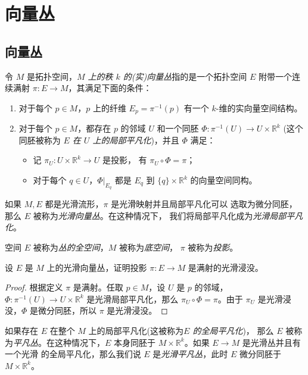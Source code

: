 \documentclass[fontset=none]{Notes}
\begin{document}
\chapter{向量丛}

\section{向量丛}

令 $M$ 是拓扑空间，\emph{$M$ 上的秩 $k$ 的(实)向量丛}指的是一个拓扑空间
$E$ 附带一个连续满射 $\pi:E\to M$，其满足下面的条件：
\begin{enumerate}
  \item 对于每个 $p\in M$，$p$ 上的纤维 $E_p=\pi^{-1}(p)$ 有一个
  $k$-维的实向量空间结构。
  \item 对于每个 $p\in M$，都存在 $p$ 的邻域 $U$ 和一个同胚
  $\varPhi:\pi^{-1}(U)\to U\times \mathbb{R}^k$ (这个同胚被称为
  \emph{$E$ 在 $U$ 上的局部平凡化})，并且 $\varPhi$ 满足：
  \begin{itemize}[nosep]
    \item 记 $\pi_U:U\times \mathbb{R}^k\to U$ 是投影，
    有 $\pi_U\circ\varPhi=\pi$；
    \item 对于每个 $q\in U$，$\varPhi|_{{E_q}}$ 都是
    $E_q$ 到 $\{q\}\times \mathbb{R}^k$ 的向量空间同构。
  \end{itemize}
\end{enumerate} 
如果 $M,E$ 都是光滑流形，$\pi$ 是光滑映射并且局部平凡化可以
选取为微分同胚，那么 $E$ 被称为\emph{光滑向量丛}。在这种情况下，
我们将局部平凡化成为\emph{光滑局部平凡化}。

空间 $E$ 被称为\emph{丛的全空间}，$M$ 被称为\emph{底空间}，
$\pi$ 被称为\emph{投影}。

\begin{exercise}
  设 $E$ 是 $M$ 上的光滑向量丛，证明投影 $\pi:E\to M$
  是满射的光滑浸没。
\end{exercise}
\begin{proof}
  根据定义 $\pi$ 是满射。任取 $p\in M$，设 $U$ 是 $p$ 的邻域，
  $\varPhi:\pi^{-1}(U)\to U\times \mathbb{R}^k$ 是光滑局部平凡化，那么
  $\pi_U\circ\varPhi=\pi$。由于 $\pi_U$ 是光滑浸没，$\varPhi$
  是微分同胚，所以 $\pi$ 是光滑浸没。
\end{proof}

如果存在 $E$ 在整个 $M$ 上的局部平凡化(这被称为\emph{$E$ 的全局平凡化})，
那么 $E$ 被称为\emph{平凡丛}。在这种情况下，$E$ 本身同胚于
$M\times \mathbb{R}^k$。如果 $E\to M$ 是光滑丛并且有一个光滑
的全局平凡化，那么我们说 $E$ 是\emph{光滑平凡丛}，此时
$E$ 微分同胚于 $M\times \mathbb{R}^k$。
\end{document}
